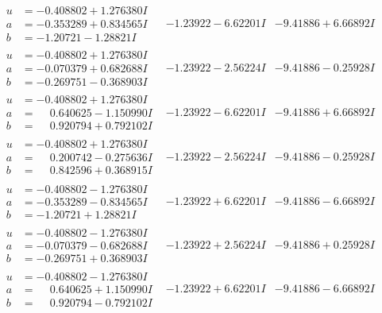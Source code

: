 \documentclass[1p]{elsarticle_modified}
\theoremstyle{definition}
\begin{document}
$$\begin{array}{c|c|c}
\begin{aligned}
u &= -0.408802 + 1.276380 I \\
a &= -0.353289 + 0.834565 I \\
b &= -1.20721 - 1.28821 I\end{aligned}
 & -1.23922 - 6.62201 I & -9.41886 + 6.66892 I \\ \hline\begin{aligned}
u &= -0.408802 + 1.276380 I \\
a &= -0.070379 + 0.682688 I \\
b &= -0.269751 - 0.368903 I\end{aligned}
 & -1.23922 - 2.56224 I & -9.41886 - 0.25928 I \\ \hline\begin{aligned}
u &= -0.408802 + 1.276380 I \\
a &= \phantom{-}0.640625 - 1.150990 I \\
b &= \phantom{-}0.920794 + 0.792102 I\end{aligned}
 & -1.23922 - 6.62201 I & -9.41886 + 6.66892 I \\ \hline\begin{aligned}
u &= -0.408802 + 1.276380 I \\
a &= \phantom{-}0.200742 - 0.275636 I \\
b &= \phantom{-}0.842596 + 0.368915 I\end{aligned}
 & -1.23922 - 2.56224 I & -9.41886 - 0.25928 I \\ \hline\begin{aligned}
u &= -0.408802 - 1.276380 I \\
a &= -0.353289 - 0.834565 I \\
b &= -1.20721 + 1.28821 I\end{aligned}
 & -1.23922 + 6.62201 I & -9.41886 - 6.66892 I \\ \hline\begin{aligned}
u &= -0.408802 - 1.276380 I \\
a &= -0.070379 - 0.682688 I \\
b &= -0.269751 + 0.368903 I\end{aligned}
 & -1.23922 + 2.56224 I & -9.41886 + 0.25928 I \\ \hline\begin{aligned}
u &= -0.408802 - 1.276380 I \\
a &= \phantom{-}0.640625 + 1.150990 I \\
b &= \phantom{-}0.920794 - 0.792102 I\end{aligned}
 & -1.23922 + 6.62201 I & -9.41886 - 6.66892 I \\ \hline\begin{aligned}

\end{aligned}
\end{array}$$
\end{document}
